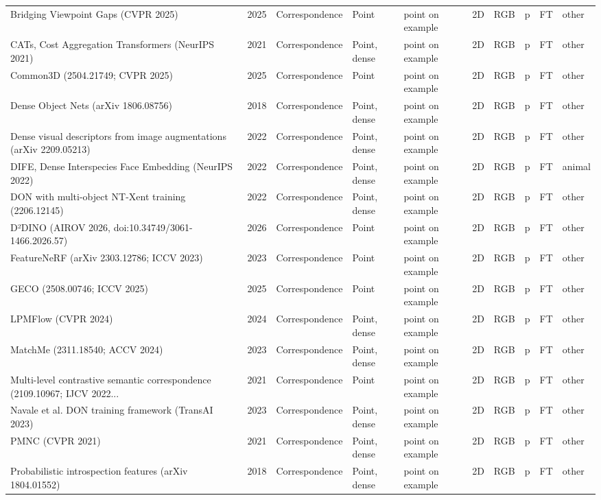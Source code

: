 {\begin{landscape}
\begin{longtable}{@{}p{4.6cm}rp{2.0cm}lllllcl@{}}
Bridging Viewpoint Gaps (CVPR 2025) & 2025 & Correspondence & Point & point on example & 2D & RGB & p & FT & other \\
CATs, Cost Aggregation Transformers (NeurIPS 2021) & 2021 & Correspondence & Point, dense & point on example & 2D & RGB & p & FT & other \\
Common3D (2504.21749; CVPR 2025) & 2025 & Correspondence & Point & point on example & 2D & RGB & p & FT & other \\
Dense Object Nets (arXiv 1806.08756) & 2018 & Correspondence & Point, dense & point on example & 2D & RGB & p & FT & other \\
Dense visual descriptors from image augmentations (arXiv 2209.05213) & 2022 & Correspondence & Point, dense & point on example & 2D & RGB & p & FT & other \\
DIFE, Dense Interspecies Face Embedding (NeurIPS 2022) & 2022 & Correspondence & Point, dense & point on example & 2D & RGB & p & FT & animal \\
DON with multi-object NT-Xent training (2206.12145) & 2022 & Correspondence & Point, dense & point on example & 2D & RGB & p & FT & other \\
D²DINO (AIROV 2026, doi:10.34749/3061-1466.2026.57) & 2026 & Correspondence & Point & point on example & 2D & RGB & p & FT & other \\
FeatureNeRF (arXiv 2303.12786; ICCV 2023) & 2023 & Correspondence & Point & point on example & 2D & RGB & p & FT & other \\
GECO (2508.00746; ICCV 2025) & 2025 & Correspondence & Point & point on example & 2D & RGB & p & FT & other \\
LPMFlow (CVPR 2024) & 2024 & Correspondence & Point, dense & point on example & 2D & RGB & p & FT & other \\
MatchMe (2311.18540; ACCV 2024) & 2023 & Correspondence & Point, dense & point on example & 2D & RGB & p & FT & other \\
Multi-level contrastive semantic correspondence (2109.10967; IJCV 2022... & 2021 & Correspondence & Point & point on example & 2D & RGB & p & FT & other \\
Navale et al. DON training framework (TransAI 2023) & 2023 & Correspondence & Point, dense & point on example & 2D & RGB & p & FT & other \\
PMNC (CVPR 2021) & 2021 & Correspondence & Point, dense & point on example & 2D & RGB & p & FT & other \\
Probabilistic introspection features (arXiv 1804.01552) & 2018 & Correspondence & Point, dense & point on example & 2D & RGB & p & FT & other \\

\end{longtable}
\end{landscape}}

